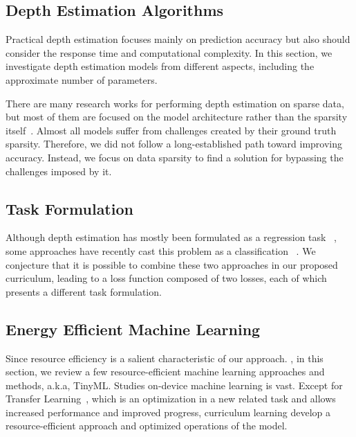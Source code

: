 \documentclass{article}
\begin{document}
 \subsection{Depth Estimation Algorithms} Practical depth estimation focuses mainly on prediction accuracy but also should consider the response time and computational complexity. In this section, we investigate depth estimation models from different aspects, including the approximate number of parameters. 
 
There are many research works for performing depth estimation on sparse data, but most of them are focused on the model architecture rather than the sparsity itself~\cite{DBLP:journals/corr/abs-1808-00769,fu2019monocular,DBLP:journals/corr/abs-1910-06727,DBLP:journals/corr/abs-1809-09061,DBLP:journals/corr/abs-2008-05158,8624583,uhrig2017sparsity}. 
Almost all models suffer from challenges created by their ground truth sparsity. Therefore, we did not follow a long-established path toward improving accuracy. Instead, we focus on data sparsity to find a solution for bypassing the challenges imposed by it.


\subsection{Task Formulation} Although depth estimation has mostly been formulated as a regression task ~\cite{eigen,alhashim2018high,bts,huynh2020guiding,hu2019revisiting,hao2018detail,xu2017multi,xu2018structured}, some approaches have recently cast this problem as a classification ~\cite{dorn,adabins}. We conjecture that it is possible to combine these two approaches in our proposed curriculum, leading to a loss function composed of two losses, each of which presents a different task formulation.

\subsection{Energy Efficient Machine Learning} Since resource efficiency is a salient characteristic of our approach. , in this section, we review a few resource-efficient machine learning approaches and methods, a.k.a, TinyML. Studies on-device machine learning is vast. 
Except for Transfer Learning~\cite{cass2019taking,cai2020tinytl}, which is an optimization in a new related task and allows increased performance and improved progress, curriculum learning develop a resource-efficient approach and optimized operations of the model.
\end{document}
